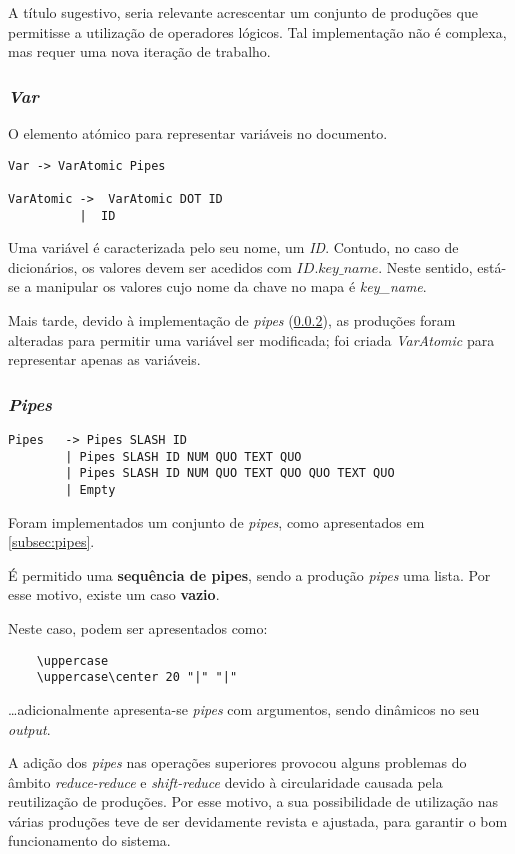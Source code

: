 \documentclass[../relatorio.tex]{subfiles}
\begin{document}
A título sugestivo, seria relevante acrescentar um conjunto de produções
que permitisse a utilização de operadores lógicos.
Tal implementação não é complexa, mas requer uma nova iteração de trabalho.

\subsubsection{\textit{Var}} \label{grm:vars}
O elemento atómico para representar variáveis no documento.

\begin{verbatim}
Var -> VarAtomic Pipes

VarAtomic ->  VarAtomic DOT ID                          
          |  ID   
\end{verbatim}

Uma variável é caracterizada pelo seu nome, um \textit{ID}.
Contudo, no caso de dicionários, os valores devem ser acedidos 
com $ID.key\_name$.
Neste sentido, está-se a manipular os valores cujo nome da 
chave no mapa é \textit{key\_name}.

Mais tarde, devido à implementação de \textit{pipes} (\ref{grm:pipes}), 
as produções foram alteradas para permitir uma variável 
ser modificada; foi criada \textit{VarAtomic} para representar
apenas as variáveis.
 
\subsubsection{\textit{Pipes}} \label{grm:pipes}
\begin{verbatim}
Pipes   -> Pipes SLASH ID                                
        | Pipes SLASH ID NUM QUO TEXT QUO                
        | Pipes SLASH ID NUM QUO TEXT QUO QUO TEXT QUO   
        | Empty   
\end{verbatim}
Foram implementados um conjunto de \textit{pipes}, 
como apresentados em \ref{subsec:pipes}.

É permitido uma \textbf{sequência de pipes}, sendo a produção
\textit{pipes} uma lista.
Por esse motivo, existe um caso \textbf{vazio}.

Neste caso, podem ser apresentados como:
\begin{verbatim}
    \uppercase
    \uppercase\center 20 "|" "|"
\end{verbatim}
\dots adicionalmente apresenta-se \textit{pipes} com argumentos, sendo 
dinâmicos no seu \textit{output}.

A adição dos \textit{pipes} nas operações superiores provocou 
alguns problemas do âmbito \textit{reduce-reduce} e \textit{shift-reduce} devido à circularidade
causada pela reutilização de produções.
Por esse motivo, a sua possibilidade de utilização nas várias produções teve de ser 
devidamente revista e ajustada, para garantir o bom funcionamento do sistema.
\end{document}
